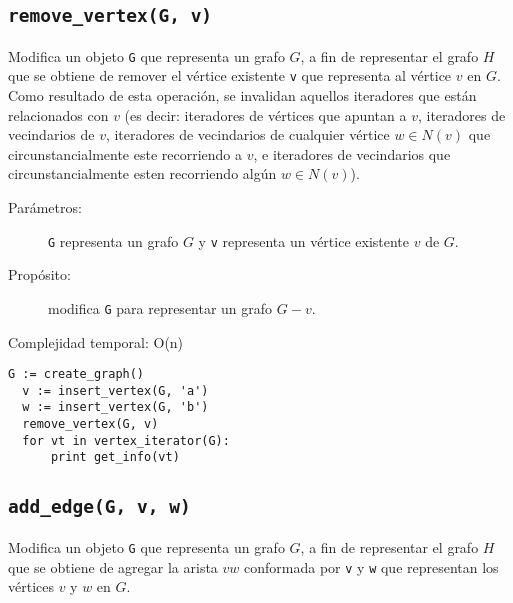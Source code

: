 \documentclass[%
    a4paper,%
    12pt,%
    twoside,%
    openright,%
    halfparskip,%
    cleardoubleempty,%
    bigheadings,%
    titlepage,%
    headsepline%
]{scrbook}
\makeatletter
\newcommand{\Code}[1]{\lstinline[basicstyle={\tt}]@#1@}
\makeatother
\begin{document}
\subsection{\texttt{remove\_vertex(G, v)}}
\label{sec:tad grafo:remove-vertex}

Modifica un objeto \Code{G} que representa un grafo $G$, a fin de representar el grafo $H$ que se obtiene de remover el vértice existente \Code{v} que representa al vértice $v$ en $G$.  Como resultado de esta operación, se invalidan aquellos iteradores que están relacionados con $v$ (es decir: iteradores de vértices que apuntan a $v$, iteradores de vecindarios de $v$, iteradores de vecindarios de cualquier vértice $w \in N(v)$ que circunstancialmente este recorriendo a $v$, e iteradores de vecindarios que circunstancialmente esten recorriendo algún $w \in N(v)$).
  
\begin{description}
  \item [Parámetros:] \Code{G} representa un grafo $G$ y \Code{v} representa un vértice existente $v$ de $G$.
  \item [Propósito:] modifica \Code{G} para representar un grafo $G - v$.
  \item [Complejidad temporal: O(n)]
\end{description}


\begin{lstlisting}[caption={Ejemplo de uso de remove\_vertex. El código crea un grafo $G$ con dos vértices, el primero \texttt{v} representa al vértice $v$ con la letra 'a' y el segundo \texttt{w} representa al vértice $w$ con la letra 'b' como infomación. Luego, remueve \texttt{v} del grafo y el ciclo imprime ``b'' como resultado. Ver Sección~\ref{sec:tad grafo:vertex-iterator} para más información de \texttt{vertex\_iterator}.},gobble=2,float=ht,label={lst:pseudo:remove_vertex},emph={remove_vertex}]
  G := create_graph()
  v := insert_vertex(G, 'a')
  w := insert_vertex(G, 'b')
  remove_vertex(G, v)
  for vt in vertex_iterator(G):
      print get_info(vt)
\end{lstlisting}


\subsection{\texttt{add\_edge(G, v, w)}}
\label{sec:tad grafo:add-edge}

Modifica un objeto \Code{G} que representa un grafo $G$, a fin de representar el grafo $H$ que se obtiene de agregar la arista $vw$ conformada por \Code{v} y \Code{w} que representan los vértices $v$ y $w$ en $G$.
\end{document}
